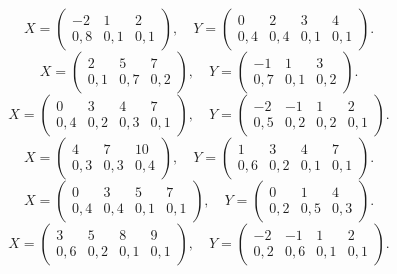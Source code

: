 $$ X = \left(\begin{array}{*{3}{c}} -2 & 1 & 2 \\ 0{,}8 & 0{,}1 & 0{,}1 \end{array}\right), \quad Y = \left(\begin{array}{*{4}{c}} 0 & 2 & 3 & 4 \\ 0{,}4 & 0{,}4 & 0{,}1 & 0{,}1 \end{array}\right). $$
$$ X = \left(\begin{array}{*{3}{c}} 2 & 5 & 7 \\ 0{,}1 & 0{,}7 & 0{,}2 \end{array}\right), \quad Y = \left(\begin{array}{*{3}{c}} -1 & 1 & 3 \\ 0{,}7 & 0{,}1 & 0{,}2 \end{array}\right). $$
$$ X = \left(\begin{array}{*{4}{c}} 0 & 3 & 4 & 7 \\ 0{,}4 & 0{,}2 & 0{,}3 & 0{,}1 \end{array}\right), \quad Y = \left(\begin{array}{*{4}{c}} -2 & -1 & 1 & 2 \\ 0{,}5 & 0{,}2 & 0{,}2 & 0{,}1 \end{array}\right). $$
$$ X = \left(\begin{array}{*{3}{c}} 4 & 7 & 10 \\ 0{,}3 & 0{,}3 & 0{,}4 \end{array}\right), \quad Y = \left(\begin{array}{*{4}{c}} 1 & 3 & 4 & 7 \\ 0{,}6 & 0{,}2 & 0{,}1 & 0{,}1 \end{array}\right). $$
$$ X = \left(\begin{array}{*{4}{c}} 0 & 3 & 5 & 7 \\ 0{,}4 & 0{,}4 & 0{,}1 & 0{,}1 \end{array}\right), \quad Y = \left(\begin{array}{*{3}{c}} 0 & 1 & 4 \\ 0{,}2 & 0{,}5 & 0{,}3 \end{array}\right). $$
$$ X = \left(\begin{array}{*{4}{c}} 3 & 5 & 8 & 9 \\ 0{,}6 & 0{,}2 & 0{,}1 & 0{,}1 \end{array}\right), \quad Y = \left(\begin{array}{*{4}{c}} -2 & -1 & 1 & 2 \\ 0{,}2 & 0{,}6 & 0{,}1 & 0{,}1 \end{array}\right). $$
